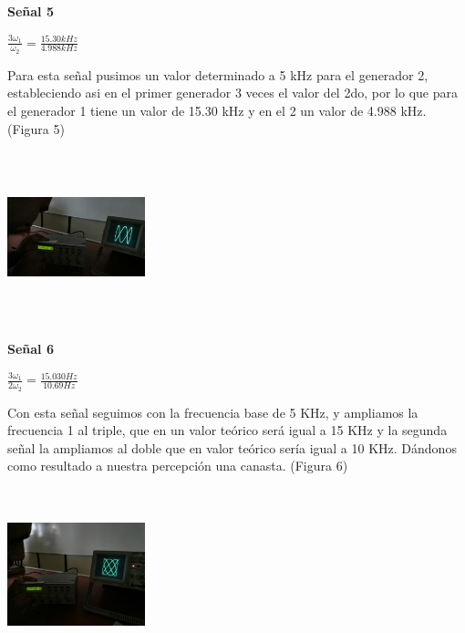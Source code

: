 \documentclass[10pt]{article}
\begin{document}
\begin{multicols}{2}
\textbf{Señal 5}\\
\begin{center}
    
$\frac{3\omega_{1}}{\omega_{2}}=\frac{15.30 kHz}{4.988 kHz}$\\
\end{center}
Para esta señal pusimos un valor determinado a 5 kHz para el generador 2, estableciendo asi en el primer generador 3 veces el valor del 2do, por lo que para el generador 1 tiene un valor de 15.30 kHz y en el 2 un valor de 4.988 kHz. (Figura 5)\\
\begin{center}
	\includegraphics[width=4cm,height=5cm]{Imagenes/5.png}
	\label{fig:5}
\end{center}

\textbf{Señal 6}\\
\begin{center}
    
$\frac{3\omega_{1}}{2\omega_{2}}=\frac{15.030 Hz}{10.69 Hz}$\\
\end{center}
Con esta señal seguimos con la frecuencia base de 5 KHz, y ampliamos la frecuencia 1 al triple, que en un valor teórico será igual a 15 KHz y la segunda señal la ampliamos al doble que en valor teórico sería igual a 10 KHz. Dándonos como resultado a nuestra percepción una canasta. (Figura 6)
\begin{center}
	\includegraphics[width=4cm,height=5cm]{Imagenes/6.png}
	\label{fig:6}
\end{center}



\end{multicols}
\end{document}
